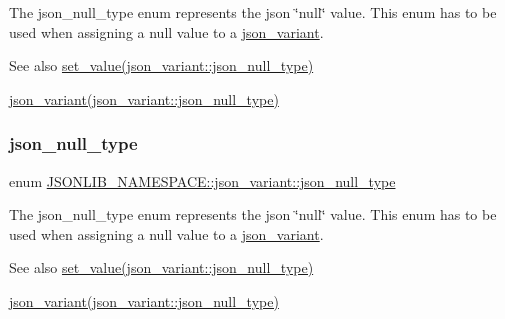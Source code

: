 The json\+\_\+null\+\_\+type enum represents the json \char`\"{}null\char`\"{} value. This enum has to be used when assigning a null value to a \hyperlink{classJSONLIB__NAMESPACE_1_1json__variant}{json\+\_\+variant}. 

\begin{DoxySeeAlso}{See also}
\hyperlink{classJSONLIB__NAMESPACE_1_1json__variant_a7a03b67a13382beb917ea7a3d446fcd2}{set\+\_\+value(json\+\_\+variant\+::json\+\_\+null\+\_\+type)} 

\hyperlink{classJSONLIB__NAMESPACE_1_1json__variant_a629877f8e133d0731ad96cf2972dd244}{json\+\_\+variant(json\+\_\+variant\+::json\+\_\+null\+\_\+type)} 
\end{DoxySeeAlso}
\mbox{\label{classJSONLIB__NAMESPACE_1_1json__variant_a1251d2c28258eeebea991ed0b39c3e0c}} 
\subsubsection{\texorpdfstring{json\+\_\+null\+\_\+type}{json\_null\_type}\hspace{0.1cm}{\footnotesize\ttfamily [2/2]}}
{\footnotesize\ttfamily enum \hyperlink{classJSONLIB__NAMESPACE_1_1json__variant_a1251d2c28258eeebea991ed0b39c3e0c}{J\+S\+O\+N\+L\+I\+B\+\_\+\+N\+A\+M\+E\+S\+P\+A\+C\+E\+::json\+\_\+variant\+::json\+\_\+null\+\_\+type}}



The json\+\_\+null\+\_\+type enum represents the json \char`\"{}null\char`\"{} value. This enum has to be used when assigning a null value to a \hyperlink{classJSONLIB__NAMESPACE_1_1json__variant}{json\+\_\+variant}. 

\begin{DoxySeeAlso}{See also}
\hyperlink{classJSONLIB__NAMESPACE_1_1json__variant_a7a03b67a13382beb917ea7a3d446fcd2}{set\+\_\+value(json\+\_\+variant\+::json\+\_\+null\+\_\+type)} 

\hyperlink{classJSONLIB__NAMESPACE_1_1json__variant_a629877f8e133d0731ad96cf2972dd244}{json\+\_\+variant(json\+\_\+variant\+::json\+\_\+null\+\_\+type)} 
\end{DoxySeeAlso}


